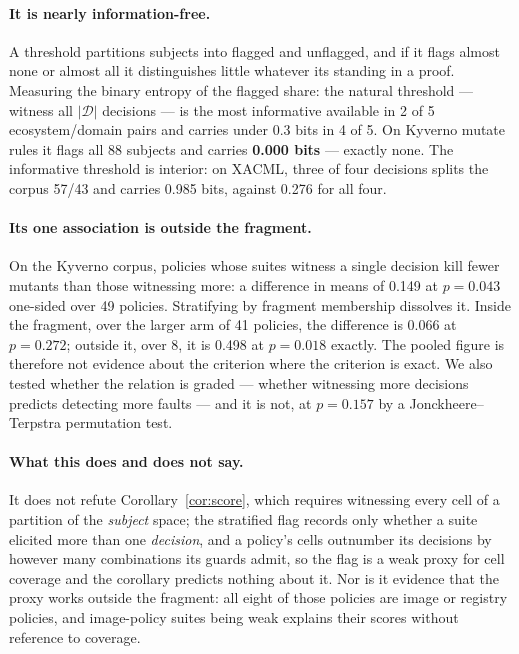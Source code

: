 \documentclass[11pt,a4paper]{article}
\theoremstyle{plain}
\theoremstyle{definition}
\theoremstyle{remark}
\newcommand{\Dom}{\mathcal{D}}
\begin{document}
\paragraph{It is nearly information-free.} A threshold partitions subjects into flagged and
unflagged, and if it flags almost none or almost all it distinguishes little whatever its
standing in a proof. Measuring the binary entropy of the flagged share: the natural
threshold --- witness all $|\Dom|$ decisions --- is the most informative available in 2 of 5
ecosystem/domain pairs and carries under 0.3 bits in 4 of 5. On Kyverno mutate rules it
flags all 88 subjects and carries \textbf{0.000 bits} --- exactly none. The informative threshold is
interior: on XACML, three of four decisions splits the corpus 57/43 and carries 0.985 bits,
against 0.276 for all four.

\paragraph{Its one association is outside the fragment.} On the Kyverno corpus, policies
whose suites witness a single decision kill fewer mutants than those witnessing more: a
difference in means of 0.149 at $p = 0.043$ one-sided over 49 policies. Stratifying by
fragment membership dissolves it. Inside the fragment, over the larger arm of 41 policies,
the difference is 0.066 at $p = 0.272$; outside it, over 8, it is 0.498 at $p = 0.018$
exactly. The pooled figure is therefore not evidence about the criterion where the criterion
is exact. We also tested whether the relation is graded --- whether witnessing more decisions
predicts detecting more faults --- and it is not, at $p = 0.157$ by a Jonckheere--Terpstra
permutation test.

\paragraph{What this does and does not say.} It does not refute Corollary~\ref{cor:score},
which requires witnessing every cell of a partition of the \emph{subject} space; the
stratified flag records only whether a suite elicited more than one \emph{decision}, and a
policy's cells outnumber its decisions by however many combinations its guards admit, so the
flag is a weak proxy for cell coverage and the corollary predicts nothing about it. Nor is it evidence that the proxy works
outside the fragment: all eight of those policies are image or registry policies, and
image-policy suites being weak explains their scores without reference to coverage.
\end{document}
